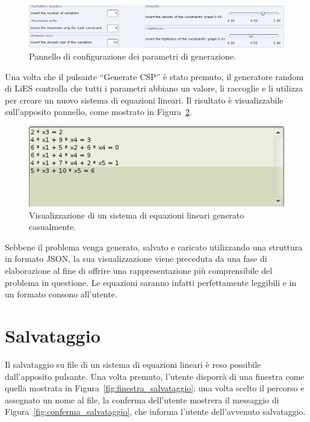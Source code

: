 \documentclass{article}
\begin{document}
\begin{figure}[htp!]
	\centering
	\includegraphics[scale=.4]{ug-images/parameters.png}
	\caption{Pannello di configurazione dei parametri di generazione.}
	\label{fig:parametri}
\end{figure}

Una volta che il pulsante ``Generate CSP'' è stato premuto, il generatore random di LiES controlla che tutti i parametri abbiano un valore, li raccoglie e li utilizza per creare un nuovo sistema di equazioni lineari. Il risultato è visualizzabile sull'apposito pannello, come mostrato in Figura~\ref{fig:visualizzazione}.

\begin{figure}[htp!]
	\centering
	\includegraphics[scale=.5]{ug-images/system.png}
	\caption{Visualizzazione di un sistema di equazioni lineari generato casualmente.}
	\label{fig:visualizzazione}
\end{figure}

Sebbene il problema venga generato, salvato e caricato utilizzando una struttura in formato JSON, la sua visualizzazione viene preceduta da una fase di elaborazione al fine di offrire una rappresentazione più comprensibile del problema in questione. Le equazioni saranno infatti perfettamente leggibili e in un formato consono all'utente.


\section{Salvataggio}
\label{sec:salvataggio}

Il salvataggio su file di un sistema di equazioni lineari è reso possibile dall'apposito pulsante. Una volta premuto, l'utente disporrà di una finestra come quella mostrata in Figura~\ref{fig:finestra_salvataggio}: una volta scelto il percorso e assegnato un nome al file, la conferma dell'utente mostrera il messaggio di Figura~\ref{fig:conferma_salvataggio}, che informa l'utente dell'avvenuto salvataggio.
\end{document}
